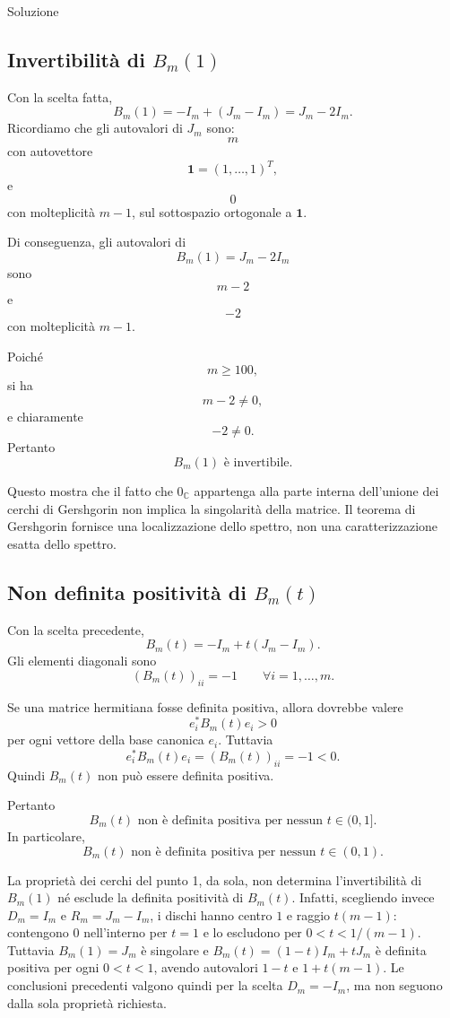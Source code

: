 \documentclass[a4paper]{article}
\begin{document}
\begin{snippetsolution}{Soluzione}
    \subsection*{Invertibilità di \(B_m(1)\)}

    Con la scelta fatta,
    \[
        B_m(1)=-I_m+(J_m-I_m)=J_m-2I_m.
    \]
    Ricordiamo che gli autovalori di \(J_m\) sono:
    \[
        m
    \]
    con autovettore
    \[
        \mathbf{1}=(1,\dots,1)^T,
    \]
    e
    \[
        0
    \]
    con molteplicità \(m-1\), sul sottospazio ortogonale a \(\mathbf{1}\).

    Di conseguenza, gli autovalori di
    \[
        B_m(1)=J_m-2I_m
    \]
    sono
    \[
        m-2
    \]
    e
    \[
        -2
    \]
    con molteplicità \(m-1\).

    Poiché
    \[
        m\geq 100,
    \]
    si ha
    \[
        m-2\neq 0,
    \]
    e chiaramente
    \[
        -2\neq 0.
    \]
    Pertanto
    \[
        \boxed{
            B_m(1)\text{ è invertibile}.
        }
    \]

    Questo mostra che il fatto che \(0_{\mathbb C}\) appartenga alla parte interna dell'unione dei cerchi di Gershgorin non implica la singolarità della matrice. Il teorema di Gershgorin fornisce una localizzazione dello spettro, non una caratterizzazione esatta dello spettro.

    \subsection*{Non definita positività di \(B_m(t)\)}

    Con la scelta precedente,
    \[
        B_m(t)=-I_m+t(J_m-I_m).
    \]
    Gli elementi diagonali sono
    \[
        (B_m(t))_{ii}=-1
        \qquad
        \forall i=1,\dots,m.
    \]

    Se una matrice hermitiana fosse definita positiva, allora dovrebbe valere
    \[
        e_i^*B_m(t)e_i>0
    \]
    per ogni vettore della base canonica \(e_i\). Tuttavia
    \[
        e_i^*B_m(t)e_i=(B_m(t))_{ii}=-1<0.
    \]
    Quindi \(B_m(t)\) non può essere definita positiva.

    Pertanto
    \[
        \boxed{
            B_m(t)\text{ non è definita positiva per nessun }t\in(0,1].
        }
    \]
    In particolare,
    \[
        B_m(t)\text{ non è definita positiva per nessun }t\in(0,1).
    \]

    La proprietà dei cerchi del punto 1, da sola, non determina l'invertibilità di \(B_m(1)\) né esclude la definita positività di \(B_m(t)\).
    Infatti, scegliendo invece \(D_m=I_m\) e \(R_m=J_m-I_m\), i dischi hanno centro \(1\) e raggio \(t(m-1)\): contengono \(0\) nell'interno per \(t=1\) e lo escludono per \(0<t<1/(m-1)\).
    Tuttavia \(B_m(1)=J_m\) è singolare e \(B_m(t)=(1-t)I_m+tJ_m\) è definita positiva per ogni \(0<t<1\), avendo autovalori \(1-t\) e \(1+t(m-1)\).
    Le conclusioni precedenti valgono quindi per la scelta \(D_m=-I_m\), ma non seguono dalla sola proprietà richiesta.
\end{snippetsolution}
\end{document}
